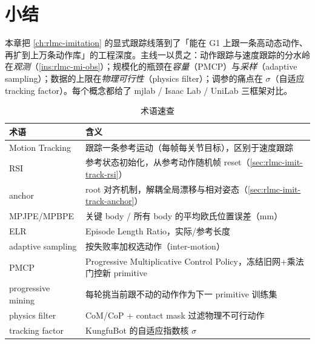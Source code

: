 \section*{小结}
\label{sec:rlmc-mi-summary}

本章把 \cref{ch:rlmc-imitation} 的显式跟踪线落到了「能在 G1 上跟一条高动态动作、再扩到上万条动作库」的工程深度。主线一以贯之：动作跟踪与速度跟踪的分水岭在\emph{观测}（\cref{ins:rlmc-mi-obs}）；规模化的瓶颈在\emph{容量}（PMCP）与\emph{采样}（adaptive sampling）；数据的上限在\emph{物理可行性}（physics filter）；调参的痛点在 $\sigma$（自适应 tracking factor）。每个概念都给了 mjlab / Isaac Lab / UniLab 三框架对比。

\begin{table}[H]
\centering
\small
\caption{术语速查}
\label{tab:rlmc-mi-glossary}
\begin{tabular}{@{}ll@{}}
\toprule
术语 & 含义 \\
\midrule
Motion Tracking & 跟踪一条参考运动（每帧每关节目标），区别于速度跟踪 \\
RSI & 参考状态初始化，从参考动作随机帧 reset（\cref{sec:rlmc-imit-track-rsi}） \\
anchor & root 对齐机制，解耦全局漂移与相对姿态（\cref{sec:rlmc-imit-track-anchor}） \\
MPJPE/MPBPE & 关键 body / 所有 body 的平均欧氏位置误差（mm） \\
ELR & Episode Length Ratio，实际/参考长度 \\
adaptive sampling & 按失败率加权选动作（inter-motion） \\
PMCP & Progressive Multiplicative Control Policy，冻结旧网+乘法门控新 primitive \\
progressive mining & 每轮挑当前跟不动的动作作为下一 primitive 训练集 \\
physics filter & CoM/CoP + contact mask 过滤物理不可行动作 \\
tracking factor & KungfuBot 的自适应指数核 $\sigma$ \\
\bottomrule
\end{tabular}
\end{table}

